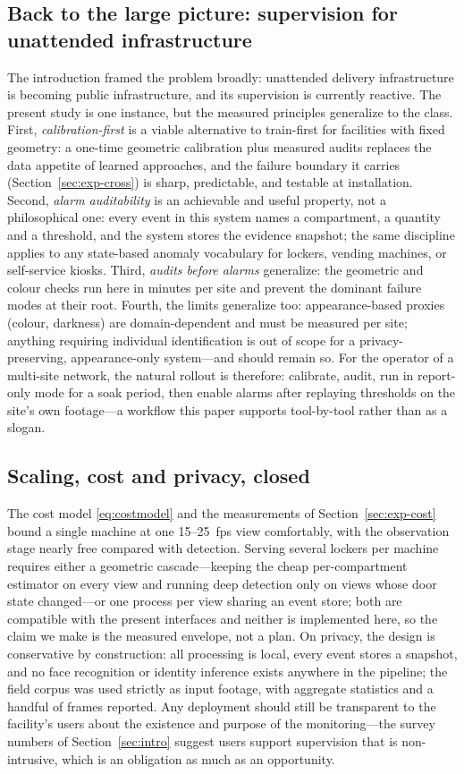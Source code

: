 \documentclass[journal,article,submit,oneauthor]{Definitions/mdpi}
\begin{document}
\subsection{Back to the large picture: supervision for unattended infrastructure}
The introduction framed the problem broadly: unattended delivery infrastructure is
becoming public infrastructure, and its supervision is currently reactive. The present
study is one instance, but the measured principles generalize to the class. First,
\emph{calibration-first} is a viable alternative to train-first for facilities with fixed
geometry: a one-time geometric calibration plus measured audits replaces the data appetite
of learned approaches, and the failure boundary it carries (Section~\ref{sec:exp-cross}) is
sharp, predictable, and testable at installation. Second, \emph{alarm auditability} is an
achievable and useful property, not a philosophical one: every event in this system names a
compartment, a quantity and a threshold, and the system stores the evidence snapshot; the
same discipline applies to any state-based anomaly vocabulary for lockers, vending
machines, or self-service kiosks. Third, \emph{audits before alarms} generalize: the
geometric and colour checks run here in minutes per site and prevent the dominant failure
modes at their root. Fourth, the limits generalize too: appearance-based proxies (colour,
darkness) are domain-dependent and must be measured per site; anything requiring
individual identification is out of scope for a privacy-preserving, appearance-only
system---and should remain so. For the operator of a multi-site network, the natural
rollout is therefore: calibrate, audit, run in report-only mode for a soak period, then
enable alarms after replaying thresholds on the site's own footage---a workflow this paper
supports tool-by-tool rather than as a slogan.

\subsection{Scaling, cost and privacy, closed}
The cost model \eqref{eq:costmodel} and the measurements of Section~\ref{sec:exp-cost} bound a single machine at
one 15--25~fps view comfortably, with the observation stage nearly free compared with
detection. Serving several lockers per machine requires either a geometric cascade---keeping
the cheap per-compartment estimator on every view and running deep detection only on views
whose door state changed---or one process per view sharing an event store; both are
compatible with the present interfaces and neither is implemented here, so the claim we
make is the measured envelope, not a plan. On privacy, the design is conservative by
construction: all processing is local, every event stores a snapshot, and no face
recognition or identity inference exists anywhere in the pipeline; the field corpus was
used strictly as input footage, with aggregate statistics and a handful of frames reported.
Any deployment should still be transparent to the facility's users about the existence and
purpose of the monitoring---the survey numbers of Section~\ref{sec:intro} suggest users
support supervision that is non-intrusive, which is an obligation as much as an
opportunity.
\end{document}

